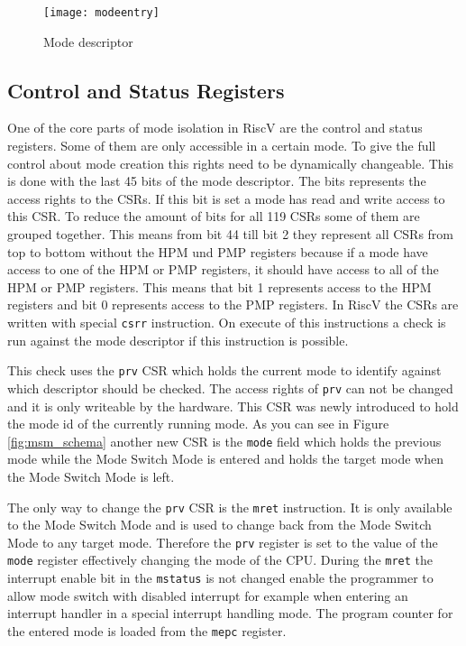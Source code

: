 \begin{figure}[h]
    \centering
    \texttt{[image: modeentry]}
    \caption{Mode descriptor}
    \label{fig:mode_descriptor}
\end{figure}

\subsection{Control and Status Registers}
One of the core parts of mode isolation in RiscV are the control and status
registers. Some of them are only accessible in a certain mode. To give the full
control about mode creation this rights need to be dynamically changeable. This
is done with the last 45 bits of the mode descriptor. The bits represents the
access rights to the CSRs. If this bit is set a mode has read and write access
to this CSR. To reduce the amount of bits for all 119 CSRs some of them are
grouped together. This means from bit 44 till bit 2 they represent all CSRs from
top to bottom without the HPM und PMP registers because if a mode have access to
one of the HPM or PMP registers, it should have access to all of the HPM or PMP
registers. This means that bit 1 represents access to the HPM registers and bit
0 represents access to the PMP registers. In RiscV the CSRs are written with
special \texttt{csrr} instruction. On execute of this instructions a check is
run against the mode descriptor if this instruction is possible.\par
This check uses the \texttt{prv} CSR which holds the current mode to identify
against which descriptor should be checked. The access rights of \texttt{prv}
can not be changed and it is only writeable by the hardware. This
CSR was newly introduced to hold the mode id of the currently running mode.
As you can see in Figure \ref{fig:msm_schema} another new CSR is the \texttt{mode} field which
holds the previous mode while the Mode Switch Mode is entered and holds the
target mode when the Mode Switch Mode is left.\par
The only way to change the \texttt{prv} CSR is the \texttt{mret} instruction. It
is only available to the Mode Switch Mode and is used to change back from the
Mode Switch Mode to any target mode. Therefore the \texttt{prv} register is set
to the value of the \texttt{mode} register effectively changing the mode of the
CPU. During the \texttt{mret} the interrupt enable bit in the \texttt{mstatus}
is not changed enable the programmer to allow mode switch with disabled
interrupt for example when entering an interrupt handler in a special interrupt
handling mode. The program counter for the entered mode is loaded from the
\texttt{mepc} register.

